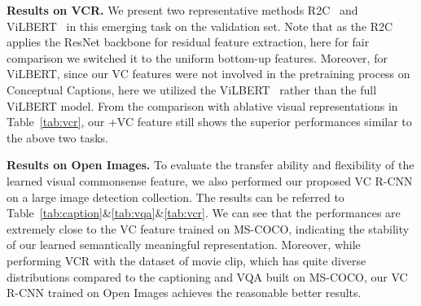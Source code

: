 \documentclass[10pt,twocolumn,letterpaper]{article}
\begin{document}
\noindent\textbf{Results on VCR.}
We present two representative methods R2C~\cite{zellers2019recognition} and ViLBERT~\cite{lu2019vilbert} in this emerging task on the validation set.
Note that as the R2C applies the ResNet backbone for residual feature extraction, here for fair comparison we 
switched it to the uniform bottom-up features. 
Moreover, for ViLBERT, since our VC features were not involved in the pretraining process on Conceptual Captions, here we utilized the ViLBERT~\cite{lu2019vilbert} rather than the full ViLBERT model.
From the comparison with ablative visual representations in Table~\ref{tab:vcr}, our +VC feature still shows the superior performances similar to the above two tasks.


\noindent\textbf{Results on Open Images.}
To evaluate the transfer ability and flexibility of the learned visual commonsense feature, we also performed our proposed VC R-CNN on a large image detection collection.
The results can be referred to Table~\ref{tab:caption}\&\ref{tab:vqa}\&\ref{tab:vcr}.
We can see that the performances are extremely close to the VC feature trained on MS-COCO, indicating the stability of our learned semantically meaningful representation.
Moreover, while performing VCR with the dataset of movie clip, which has quite diverse distributions compared to the captioning and VQA built on MS-COCO, our VC R-CNN trained on Open Images achieves the reasonable better results.



\begin{table}[]
\centering
{}
\caption{Ablation studies of our proposed intervention trained on MS-COCO and evaluated with CIDEr-D (captioning) and Accuracy (VQA) on Karpathy testset and VQA2.0 validation set.}
\label{tab:ablation}
\vspace{-0.5cm}
\end{table}
\end{document}
